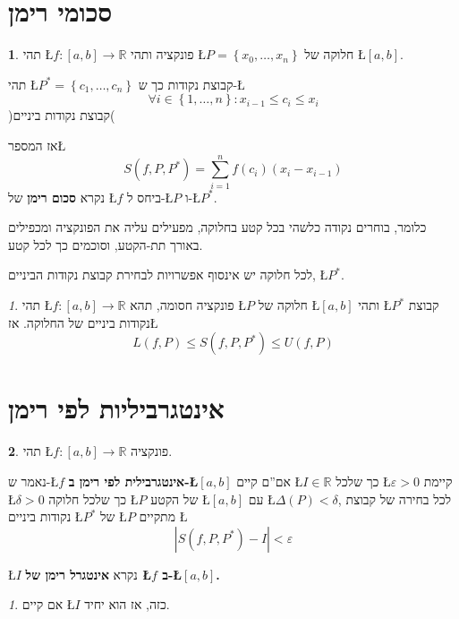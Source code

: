 \documentclass[english,hebrew]{article}
\theoremstyle{remark}
\theoremstyle{definition}
\newtheorem*{defn*}{\protect\definitionname}
\theoremstyle{plain}
\theoremstyle{remark}
\newtheorem{claim}[thm]{\protect\claimname}
\theoremstyle{plain}
\theoremstyle{plain}
\theoremstyle{definition}
\theoremstyle{plain}
\providecommand{\claimname}{טענה}
\providecommand{\definitionname}{הגדרה}
\begin{document}
\section{סכומי רימן}
\begin{defn*}
תהי \L{$f:\left[a,b\right]\rightarrow\mathbb{R}$} פונקציה ותהי \L{$P=\left\{ x_{0},\dots,x_{n}\right\} $}
חלוקה של \L{$\left[a,b\right]$}.

תהי \L{$P^{*}=\left\{ c_{1},\dots,c_{n}\right\} $} קבוצת נקודות כך
ש-\L{%
\[
\forall i\in\left\{ 1,\dots,n\right\} :x_{i-1}\le c_{i}\le x_{i}
\]
}%
)קבוצת נקודות ביניים(

אז המספר\L{%
\[
S\left(f,P,P^{*}\right)=\underset{i=1}{\overset{n}{\sum}}f\left(c_{i}\right)\left(x_{i}-x_{i-1}\right)
\]
}%
 נקרא \textbf{סכום רימן} של \L{$f$} ביחס ל-\L{$P$} ו-\L{$P^{*}$}.

כלומר, בוחרים נקודה כלשהי בכל קטע בחלוקה, מפעילים עליה את הפונקציה
ומכפילים באורך תת-הקטע, וסוכמים כך לכל קטע.

לכל חלוקה יש אינסוף אפשרויות לבחירת קבוצת נקודות הביניים, \L{$P^{*}$}.
\end{defn*}
\begin{claim}
תהי \L{$f:\left[a,b\right]\rightarrow\mathbb{R}$} פונקציה חסומה,
תהא \L{$P$} חלוקה של \L{$\left[a,b\right]$} ותהי \L{$P^{*}$} קבוצת
נקודות ביניים של החלוקה. אז\L{%
\[
L\left(f,P\right)\le S\left(f,P,P^{*}\right)\le U\left(f,P\right)
\]
}%
\end{claim}

\section{אינטגרביליות לפי רימן}
\begin{defn*}
תהי \L{$f:\left[a,b\right]\rightarrow\mathbb{R}$} פונקציה. 

נאמר ש-\L{$f$} \textbf{אינטגרבילית לפי רימן ב-\L{$\left[a,b\right]$}}
אם\textquotedblright ם קיים \L{$I\in\mathbb{R}$} כך שלכל \L{$\varepsilon>0$}
קיימת \L{$\delta>0$} כך שלכל חלוקה \L{$P$} של הקטע \L{$\left[a,b\right]$}
עם \L{$\Delta\left(P\right)<\delta$}, לכל בחירה של קבוצת נקודות ביניים
\L{$P^{*}$} של \L{$P$} מתקיים \L{%
\[
\left|S\left(f,P,P^{*}\right)-I\right|<\varepsilon
\]
}%

\L{$I$} נקרא \textbf{אינטגרל רימן של \L{$f$} ב-\L{$\left[a,b\right]$}.}
\end{defn*}
\begin{claim}
אם קיים \L{$I$} כזה, אז הוא יחיד. 
\end{claim}
\end{document}
